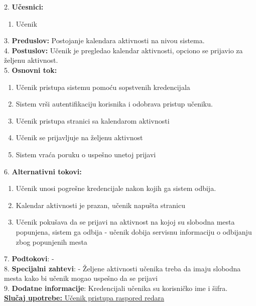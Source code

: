 \documentclass{article}
\begin{document}
2. \textbf{Učesnici:}
\begin{enumerate} [label=(\alph*)]
\item Učenik
\end{enumerate} 

3. \textbf{Preduslov:} Postojanje kalendara aktivnosti na nivou sistema. \\

4. \textbf{Postuslov:} Učenik je pregledao kalendar aktivnosti, opciono se prijavio za željenu aktivnost. \\

5. \textbf{Osnovni tok:} 
\begin{enumerate} [label=(\alph*)]
\item Učenik pristupa sistemu pomoću sopstvenih kredencijala
\item Sistem vrši autentifikaciju korisnika i odobrava pristup učeniku.
\item Učenik pristupa stranici sa kalendarom aktivnosti
\item Učenik se prijavljuje na željenu aktivnost
\item Sistem vraća poruku o uspešno unetoj prijavi
\end{enumerate}

6. \textbf{Alternativni tokovi:}
\begin{enumerate} [label=(\roman*)]
\item Učenik unosi pogrešne kredencijale nakon kojih ga sistem odbija.
\item Kalendar aktivnosti je prazan, učenik napušta stranicu
\item Učenik pokušava da se prijavi na aktivnost na kojoj su slobodna mesta popunjena, sistem ga odbija - učenik dobija servisnu informaciju o odbijanju zbog popunjenih mesta

\end{enumerate}

7. \textbf{Podtokovi}: - \\

8. \textbf{Specijalni zahtevi}: -  Željene aktivnosti učenika treba da imaju slobodna mesta kako bi učenik mogao uspešno da se prijavi\\

9. \textbf{Dodatne informacije}: Kredencijali učenika su korisničko ime i šifra. \\


\underline{\textbf{Slučaj upotrebe:} Učenik pristupa raspored redara} \\
\end{document}
